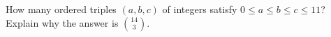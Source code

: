 How many ordered triples $(a,b,c)$ of integers satisfy $0\le a\le b\le c\le11$? Explain why the answer is $\binom{14}3$.
